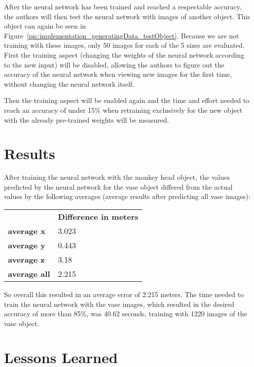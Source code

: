 After the neural network has been trained and reached a respectable accuracy, the authors will then test the neural network with images of another object. This object can again be seen in Figure~\ref{pic:implementation_generatingData_testObject}. Because we are not training with these images, only 50 images for each of the 5 sizes are evaluated. First the training aspect (changing the weights of the neural network according to the new input) will be disabled, allowing the authors to figure out the accuracy of the neural network when viewing new images for the first time, without changing the neural network itself.

Then the training aspect will be enabled again and the time and effort needed to reach an accuracy of under 15\% when retraining exclusively for the new object with the already pre-trained weights will be measured.

\section{Results}
After training the neural network with the monkey head object, the values predicted by the neural network for the vase object differed from the actual values by the following averages (average results after predicting all vase images):
\begin{table}[h!]
\begin{tabular}{ll}
                     & \textbf{Difference in meters} \\
\textbf{average x}   & 3.023                         \\
\textbf{average y}   & 0.443                         \\
\textbf{average z}   & 3.18                          \\
\textbf{average all} & 2.215                        
\end{tabular}
\end{table}

So overall this resulted in an average error of 2.215 meters.
The time needed to train the neural network with the vase images, which resulted in the desired accuracy of more than 85\%, was 40.62 seconds, training with 1220 images of the vase object.

\section{Lessons Learned}

\filbreak

